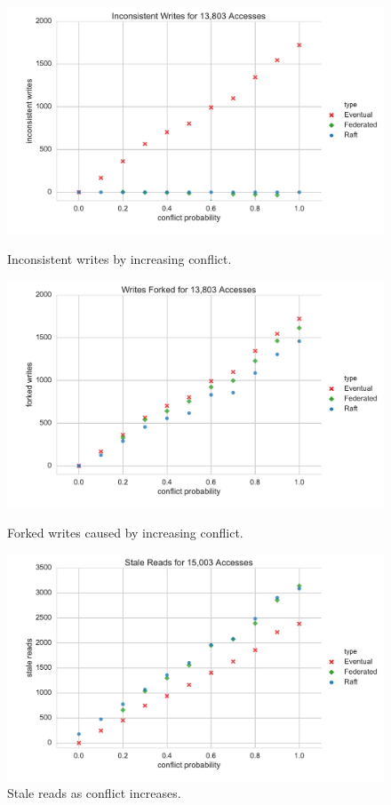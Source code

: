\documentclass[10pt,conference,compsocconf,letterpaper]{IEEEtran}
\begin{document}
\begin{figure}
    \centering
      \includegraphics[width=\linewidth]{figures/conflict/inconsistent_writes}
      \caption{Inconsistent writes by increasing conflict.}\label{fig:inconsistent_writes}
    \endminipage\hfill
      \includegraphics[width=\linewidth]{figures/conflict/forked_writes}
      \caption{Forked writes caused by increasing conflict.}\label{fig:forked_writes}
    \endminipage\hfill
      \includegraphics[width=\linewidth]{figures/conflict/stale_reads}
      \caption{Stale reads as conflict increases.}\label{fig:stale_reads}
    \endminipage
\end{figure}
\end{document}

